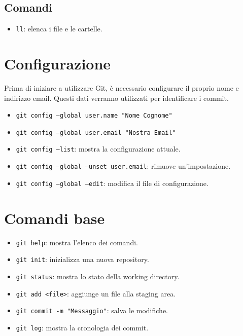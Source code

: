 \documentclass{article}
\begin{document}
\subsection{Comandi}
\begin{itemize}
    \item \texttt{ll}: elenca i file e le cartelle.
\end{itemize}

\pagebreak
\section{Configurazione}
Prima di iniziare a utilizzare Git, è necessario configurare il proprio
nome e indirizzo email. Questi dati verranno utilizzati per identificare
i commit.
\begin{itemize}
    \item \texttt{git config --global user.name "Nome Cognome"}
    \item \texttt{git config --global user.email "Nostra Email"}
    \item \texttt{git config --list}: mostra la configurazione attuale.
    \item \texttt{git config --global --unset user.email}: rimuove un'impostazione.
    \item \texttt{git config --global --edit}: modifica il file di configurazione.
\end{itemize}

\section{Comandi base}
\begin{itemize}
    \item \texttt{git help}: mostra l'elenco dei comandi.
    \item \texttt{git init}: inizializza una nuova repository.
    \item \texttt{git status}: mostra lo stato della working directory.
    \item \texttt{git add <file>}: aggiunge un file alla staging area.
    \item \texttt{git commit -m "Messaggio"}: salva le modifiche.
    \item \texttt{git log}: mostra la cronologia dei commit.
\end{itemize}
\end{document}

